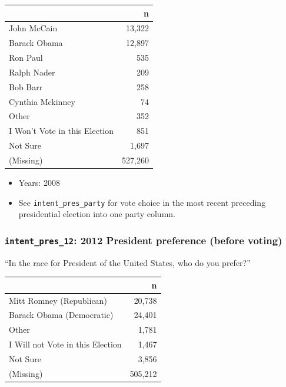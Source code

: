 \documentclass[10pt,article,oneside]{memoir}
\theoremstyle{definition}
\begin{document}
\begin{table}[H]
\centering
\begin{tabular}[t]{lr}
\toprule
 & n\\
\midrule
John McCain & 13,322\\
Barack Obama & 12,897\\
Ron Paul & 535\\
Ralph Nader & 209\\
Bob Barr & 258\\
Cynthia Mckinney & 74\\
Other & 352\\
I Won't Vote in this Election & 851\\
Not Sure & 1,697\\
(Missing) & 527,260\\
\bottomrule
\end{tabular}
\end{table}

\begin{itemize}
\tightlist
\item
  Years: 2008
\item
  See \texttt{intent\_pres\_party} for vote choice in the most recent
  preceding presidential election into one party column.
\end{itemize}

\hypertarget{intent_pres_12-2012-president-preference-before-voting}{%
\subsubsection{\texorpdfstring{\texttt{intent\_pres\_12}: 2012 President
preference (before
voting)}{intent\_pres\_12: 2012 President preference (before voting)}}\label{intent_pres_12-2012-president-preference-before-voting}}

``In the race for President of the United States, who do you prefer?''

\begin{table}[H]
\centering
\begin{tabular}[t]{lr}
\toprule
 & n\\
\midrule
Mitt Romney (Republican) & 20,738\\
Barack Obama (Democratic) & 24,401\\
Other & 1,781\\
I Will not Vote in this Election & 1,467\\
Not Sure & 3,856\\
(Missing) & 505,212\\
\bottomrule
\end{tabular}
\end{table}
\end{document}
